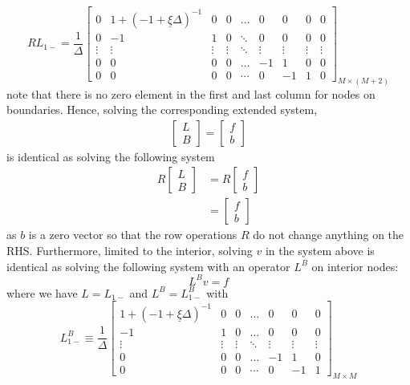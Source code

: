 \documentclass[11pt]{article}
\theoremstyle{definition}
\begin{document}
\begin{equation}
R {L}_{1-} = \dfrac{1}{\Delta} \begin{bmatrix}
0&1 + (-1 + \underline{\xi}\Delta )^{-1}&0&0&\dots&0&0&0&0\\
0&-1&1&0&\ddots&0&0&0&0\\
\vdots&\vdots&\vdots&\vdots&\ddots&\vdots&\vdots&\vdots&\vdots\\
0&0&0&0&\dots&-1&1&0&0\\
0&0&0&0&\cdots&0&-1&1&0
\end{bmatrix}_{M\times (M+2)}
\end{equation}
note that there is no zero element in the first and last column for nodes on boundaries. Hence, solving the corresponding extended system,
\begin{align}
\begin{bmatrix}
{L}\\
B
\end{bmatrix} =
\begin{bmatrix}
f \\ b
\end{bmatrix}
\end{align}
is identical as solving the following system
\begin{align}
R
\begin{bmatrix}
{L}\\
B
\end{bmatrix} &=
R
\begin{bmatrix}
f \\ b
\end{bmatrix} \\
&= \begin{bmatrix}
f \\ b
\end{bmatrix}
\end{align}
as $b$ is a zero vector so that the row operations $R$ do not change anything on the RHS. Furthermore, limited to the interior, solving $v$ in the system above is identical as solving the following system with an operator $L^B$ on interior nodes:
\begin{equation}\label{eq:system-on-interior}
L^B v = f
\end{equation}
where we have ${L} = {L}_{1-}$ and $L^B = L_{1-}^B$ with
\begin{equation}
L_{1-}^B \equiv \frac{1}{\Delta}\begin{bmatrix}
1 + (-1 + \underline{\xi} \Delta)^{-1} &0&0&\dots&0&0&0\\
-1&1&0&\dots&0&0&0\\
\vdots&\vdots&\vdots&\ddots&\vdots&\vdots&\vdots\\
0&0&0&\dots&-1&1&0\\
0&0&0&\cdots&0&-1&1
\end{bmatrix}_{M\times M} \label{eq:L-1-regular}
\end{equation}
\end{document}
